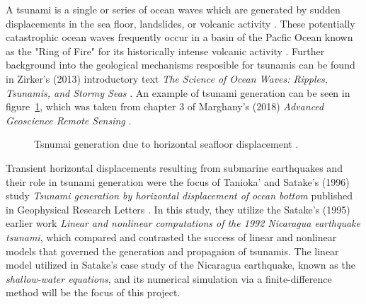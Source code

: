\documentclass[../main.tex]{subfiles}
\begin{document}
A tsunami is a single or series of ocean waves which are generated by sudden displacements in the sea floor, landslides, or volcanic activity \cite{zirker}. These potentially catastrophic ocean waves frequently occur in a basin of the Pacfic Ocean known as the "Ring of Fire" for its historically intense volcanic activity \cite{zirker}. Further background into the geological mechanisms resposible for tsunamis can be found in Zirker's (2013) introductory text \textit{The Science of Ocean Waves: Ripples, Tsunamis, and Stormy Seas} \cite{zirker}. An example of tsunami generation can be seen in figure~\ref{fig:tsu_gen}, which was taken from chapter 3 of Marghany's (2018) \textit{Advanced Geoscience Remote Sensing} \cite{marghany}. 

\begin{figure}[h]
    \centering
    \caption{Tsnumai generation due to horizontal seafloor displacement \cite{marghany}.}
    \label{fig:tsu_gen}
\end{figure}

Transient horizontal displacements resulting from submarine earthquakes and their role in tsunami generation were the focus of  Tanioka' and Satake's (1996) study \textit{Tsunami generation by horizontal displacement of ocean bottom} published in Geophysical Research Letters \cite{satake1}. In this study, they utilize the Satake's (1995) earlier work \textit{Linear and nonlinear computations of the 1992 Nicaragua earthquake tsunami}, which compared and contrasted the success of linear and nonlinear models that governed the generation and propagaion of tsunamis. The linear model utilized in Satake's case study of the Nicaragua earthquake, known as the \textit{shallow-water equations}, and its numerical simulation via a finite-difference method will be the focus of this project.
\end{document}
